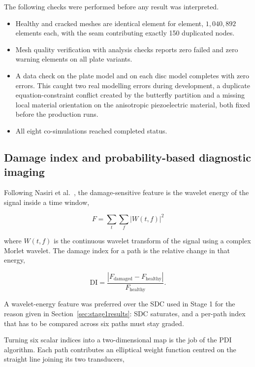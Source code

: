 The following checks were performed before any result was interpreted.

\begin{itemize}[leftmargin=*,itemsep=2pt]
  \item Healthy and cracked meshes are identical element for element, $1{,}040{,}892$ elements each, with the
  seam contributing exactly 150 duplicated nodes.
  \item Mesh quality verification with analysis checks reports zero failed and zero warning elements on all
  plate variants.
  \item A data check on the plate model and on each disc model completes with zero errors. This caught two
  real modelling errors during development, a duplicate equation-constraint conflict created by the butterfly
  partition and a missing local material orientation on the anisotropic piezoelectric material, both fixed
  before the production runs.
  \item All eight co-simulations reached completed status.
\end{itemize}

\subsection{Damage index and probability-based diagnostic imaging}
\label{sec:di3}

Following Nasiri et al.~\cite{Nasiri2022}, the damage-sensitive feature is the wavelet energy of the signal
inside a time window,

\begin{equation}
  F = \sum_{t}\sum_{f}\left|W(t,f)\right|^{2}
\end{equation}

where $W(t,f)$ is the continuous wavelet transform of the signal using a complex Morlet wavelet. The
damage index for a path is the relative change in that energy,

\begin{equation}
  \mathrm{DI} = \frac{\left|F_{\text{damaged}} - F_{\text{healthy}}\right|}{F_{\text{healthy}}}.
\end{equation}

A wavelet-energy feature was preferred over the SDC used in Stage 1 for the reason given in
Section~\ref{sec:stage1results}: SDC saturates, and a per-path index that has to be compared across six
paths must stay graded.

Turning six scalar indices into a two-dimensional map is the job of the PDI algorithm. Each path contributes
an elliptical weight function centred on the straight line joining its two transducers,

